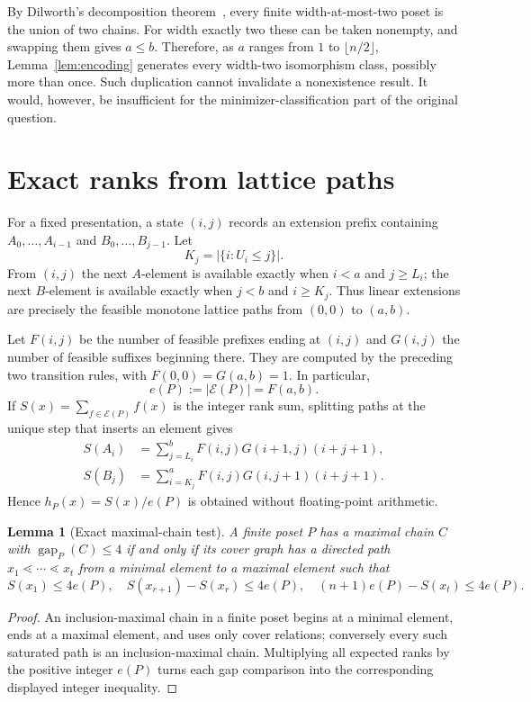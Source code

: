 \documentclass[11pt]{article}
\newtheorem{lemma}[theorem]{Lemma}
\theoremstyle{definition}
\newcommand{\cE}{\mathcal{E}}
\newcommand{\gap}{\operatorname{gap}}
\begin{document}
By Dilworth's decomposition theorem~\cite{dilworth1950}, every finite
width-at-most-two poset is the union of two chains.  For width exactly two
these can be taken nonempty, and swapping them gives $a\leq b$.  Therefore,
as $a$ ranges from $1$ to $\lfloor n/2\rfloor$, Lemma~\ref{lem:encoding}
generates every width-two isomorphism class, possibly more than once.  Such
duplication cannot invalidate a nonexistence result.  It would, however, be
insufficient for the minimizer-classification part of the original question.

\section{Exact ranks from lattice paths}

For a fixed presentation, a state $(i,j)$ records an extension prefix
containing $A_0,\ldots,A_{i-1}$ and $B_0,\ldots,B_{j-1}$.  Let
\[
 K_j=|\{i:U_i\leq j\}|.
\]
From $(i,j)$ the next $A$-element is available exactly when $i<a$ and
$j\geq L_i$; the next $B$-element is available exactly when $j<b$ and
$i\geq K_j$.  Thus linear extensions are precisely the feasible monotone
lattice paths from $(0,0)$ to $(a,b)$.

Let $F(i,j)$ be the number of feasible prefixes ending at $(i,j)$ and
$G(i,j)$ the number of feasible suffixes beginning there.  They are computed
by the preceding two transition rules, with $F(0,0)=G(a,b)=1$.  In
particular,
\[
 e(P):=|\cE(P)|=F(a,b).
\]
If $S(x)=\sum_{f\in\cE(P)}f(x)$ is the integer rank sum, splitting paths at
the unique step that inserts an element gives
\begin{align}
 S(A_i)&=\sum_{j=L_i}^{b}F(i,j)G(i+1,j)(i+j+1),\label{eq:rankA}\\
 S(B_j)&=\sum_{i=K_j}^{a}F(i,j)G(i,j+1)(i+j+1).\label{eq:rankB}
\end{align}
Hence $h_P(x)=S(x)/e(P)$ is obtained without floating-point arithmetic.

\begin{lemma}[Exact maximal-chain test]\label{lem:chain}
A finite poset $P$ has a maximal chain $C$ with $\gap_P(C)\leq4$ if and only
if its cover graph has a directed path $x_1\lessdot\cdots\lessdot x_t$ from
a minimal element to a maximal element such that
\[
 S(x_1)\leq4e(P),\quad
 S(x_{r+1})-S(x_r)\leq4e(P),\quad
 (n+1)e(P)-S(x_t)\leq4e(P).
\]
\end{lemma}

\begin{proof}
An inclusion-maximal chain in a finite poset begins at a minimal element,
ends at a maximal element, and uses only cover relations; conversely every
such saturated path is an inclusion-maximal chain.  Multiplying all expected
ranks by the positive integer $e(P)$ turns each gap comparison into the
corresponding displayed integer inequality.
\end{proof}
\end{document}

